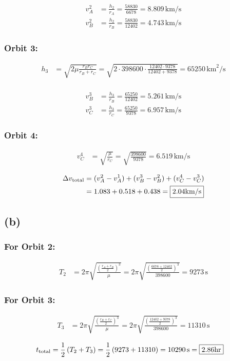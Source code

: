 \documentclass[12 pt]{article}
\begin{document}
\begin{align*}
    v_A^2 &= \frac{h_2}{r_A} = \frac{58830}{6678} = 8.809 \, \text{km/s} \\
    v_B^2 &= \frac{h_2}{r_B} = \frac{58830}{12402} = 4.743 \, \text{km/s}
\end{align*}

\subsubsection*{Orbit 3:}
\begin{align*}
    h_3 &= \sqrt{2 \mu \frac{r_B r_C}{r_B + r_C}} = \sqrt{2 \cdot 398600 \cdot \frac{12402 \cdot 9378}{12402 + 9378}} = 65250 \, \text{km}^2/\text{s} \\
\end{align*}

\begin{align*}
    v_B^3 &= \frac{h_3}{r_B} = \frac{65250}{12402} = 5.261 \, \text{km/s} \\
    v_C^3 &= \frac{h_3}{r_C} = \frac{65250}{9378} = 6.957 \, \text{km/s}
\end{align*}

\subsubsection*{Orbit 4:}
\begin{align*}
    v_C^4 &= \sqrt{\frac{\mu}{r_C}} = \sqrt{\frac{398600}{9378}} = 6.519 \, \text{km/s}
\end{align*}

\begin{align*}
    \Delta v_{\text{total}} &= (v_A^2 - v_A^1) + (v_B^3 - v_B^2) + (v_C^4 - v_C^3) \\
    &= 1.083 + 0.518 + 0.438 = \fbox{$2.04 \text{km/s}$}
\end{align*}

\subsection*{(b)}
\subsubsection*{For Orbit 2:}
\begin{align*}
    T_2 &= 2\pi \sqrt{\frac{\left( \frac{r_A + r_B}{2} \right)^3}{\mu}} = 2\pi \sqrt{\frac{\left( \frac{6678 + 12402}{2} \right)^3}{398600}} = 9273 \, \text{s}
\end{align*}

\subsubsection*{For Orbit 3:}
\begin{align*}
    T_3 &= 2\pi \sqrt{\frac{\left( \frac{r_B + r_C}{2} \right)^3}{\mu}} = 2\pi \sqrt{\frac{\left( \frac{12402 + 9378}{2} \right)^3}{398600}} = 11310 \, \text{s}
\end{align*}

\begin{align*}
    t_{\text{total}} &= \frac{1}{2} \left( T_2 + T_3 \right) = \frac{1}{2} \left( 9273 + 11310 \right) = 10290 \, \text{s} = \fbox{$2.86\text{hr}$}
\end{align*}
\end{document}
